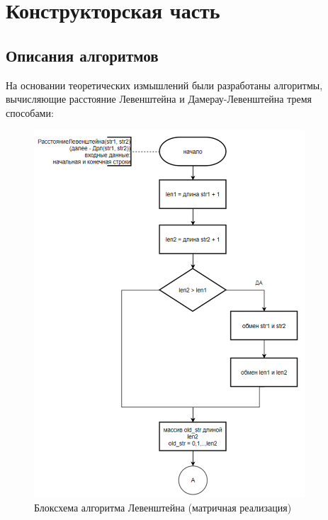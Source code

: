 \section{Конструкторская часть}
\subsection*{Описания алгоритмов}
На основании теоретических измышлений были разработаны алгоритмы, вычисляющие расстояние Левенштейна и Дамерау-Левенштейна тремя способами:\\

\begin{figure}[H]
    \centering
    \includegraphics[width=0.9\textwidth]{img/block_1_1_1.png}
    \caption{Блоксхема алгоритма Левенштейна (матричная реализация)}
\end{figure}

